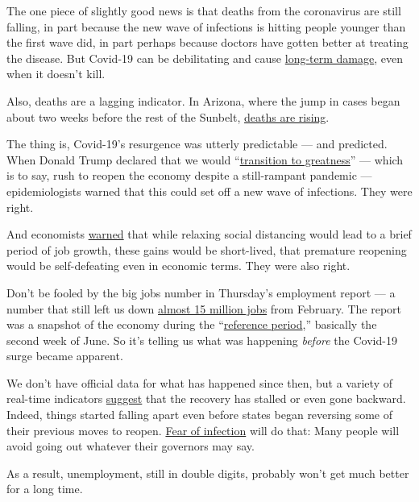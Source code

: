 The one piece of slightly good news is that deaths from the coronavirus
are still falling, in part because the new wave of infections is hitting
people younger than the first wave did, in part perhaps because doctors
have gotten better at treating the disease. But Covid-19 can be
debilitating and cause
\href{https://www.nytimes3xbfgragh.onion/2020/07/01/health/coronavirus-recovery-survivors.html?action=click\&module=Top\%20Stories\&pgtype=Homepage}{long-term
damage}, even when it doesn't kill.

Also, deaths are a lagging indicator. In Arizona, where the jump in
cases began about two weeks before the rest of the Sunbelt,
\href{https://twitter.com/COVID19Tracking/status/1278479854715809797}{deaths
are rising}.

The thing is, Covid-19's resurgence was utterly predictable --- and
predicted. When Donald Trump declared that we would
``\href{https://www.prnewsonline.com/transition-to-greatness-web-domain-trump}{transition
to greatness}'' --- which is to say, rush to reopen the economy despite
a still-rampant pandemic --- epidemiologists warned that this could set
off a new wave of infections. They were right.

And economists \href{https://t.co/4LxtfRQW1T?amp=1}{warned} that while
relaxing social distancing would lead to a brief period of job growth,
these gains would be short-lived, that premature reopening would be
self-defeating even in economic terms. They were also right.

Don't be fooled by the big jobs number in Thursday's employment report
--- a number that still left us down
\href{https://fred.stlouisfed.org/series/PAYEMS}{almost 15 million jobs}
from February. The report was a snapshot of the economy during the
``\href{https://t.co/PwzxFkZJGI?amp=1}{reference period},'' basically
the second week of June. So it's telling us what was happening
\emph{before} the Covid-19 surge became apparent.

We don't have official data for what has happened since then, but a
variety of real-time indicators
\href{https://www.nytimes3xbfgragh.onion/2020/07/01/business/economic-recovery-virus-surge.html}{suggest}
that the recovery has stalled or even gone backward. Indeed, things
started falling apart even before states began reversing some of their
previous moves to reopen. \href{https://www.nber.org/papers/w27432}{Fear
of infection} will do that: Many people will avoid going out whatever
their governors may say.

As a result, unemployment, still in double digits, probably won't get
much better for a long time.

